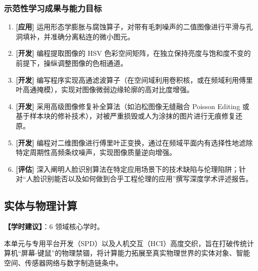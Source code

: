 \subsubsection{示范性学习成果与能力目标}
\begin{enumerate}
    \item \textbf{[应用]} 运用形态学膨胀与腐蚀算子，对带有毛刺噪声的二值图像进行平滑与孔洞填补，并准确分离粘连的微小图元。
    \item \textbf{[开发]} 编程提取图像的 HSV 色彩空间矩阵，在独立保持亮度与饱和度不变的前提下，操纵调整图像的色相通道。
    \item \textbf{[开发]} 编写程序实现高通滤波算子（在空间域利用卷积核，或在频域利用傅里叶高通掩模），实现对图像微弱边缘轮廓的高对比度增强。
    \item \textbf{[开发]} 采用高级图像修复补全算法（如泊松图像无缝融合 Poisson Editing 或基于样本块的修补技术），对被严重损毁或人为涂抹的图片进行无痕修复还原。
    \item \textbf{[开发]} 编程对二维图像进行傅里叶正变换，通过在频域平面内有选择性地滤除特定周期性高频条纹噪声，实现图像质量逆向增强。
    \item \textbf{[评估]} 深入阐明人脸识别算法在特定应用场景下的技术缺陷与伦理陷阱；针对“人脸识别能否以及如何做到合乎工程伦理的应用”撰写深度学术评述报告。
\end{enumerate}

\subsection{实体与物理计算}
\textbf{【学时建议】}：6 领域核心学时。

本单元与专用平台开发（SPD）以及人机交互（HCI）高度交织，旨在打破传统计算机“屏幕-键鼠”的物理禁锢，将计算能力拓展至真实物理世界的实体对象、智能空间、传感器网络与数字制造链条中。


